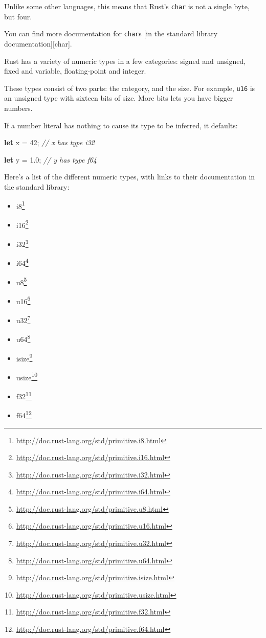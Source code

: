 \documentclass[a4paper,]{book}
\newenvironment{Shaded}{\begin{snugshade}}{\end{snugshade}}
\newcommand{\KeywordTok}[1]{\textcolor[rgb]{0.13,0.29,0.53}{\textbf{{#1}}}}
\newcommand{\DecValTok}[1]{\textcolor[rgb]{0.00,0.00,0.81}{{#1}}}
\newcommand{\CommentTok}[1]{\textcolor[rgb]{0.56,0.35,0.01}{\textit{{#1}}}}
\newcommand{\NormalTok}[1]{{#1}}
\renewcommand{\href}[2]{#2\footnote{\url{#1}}}
\begin{document}
Unlike some other languages, this means that Rust's \texttt{char} is not
a single byte, but four.

You can find more documentation for \texttt{char}s {[}in the standard
library documentation{]}{[}char{]}.


Rust has a variety of numeric types in a few categories: signed and
unsigned, fixed and variable, floating-point and integer.

These types consist of two parts: the category, and the size. For
example, \texttt{u16} is an unsigned type with sixteen bits of size.
More bits lets you have bigger numbers.

If a number literal has nothing to cause its type to be inferred, it
defaults:

\begin{Shaded}
\begin{Highlighting}[]
\KeywordTok{let} \NormalTok{x = }\DecValTok{42}\NormalTok{; }\CommentTok{// x has type i32}

\KeywordTok{let} \NormalTok{y = }\DecValTok{1.0}\NormalTok{; }\CommentTok{// y has type f64}
\end{Highlighting}
\end{Shaded}

Here's a list of the different numeric types, with links to their
documentation in the standard library:

\begin{itemize}
\itemsep1pt\parskip0pt
\item
  \href{http://doc.rust-lang.org/std/primitive.i8.html}{i8}
\item
  \href{http://doc.rust-lang.org/std/primitive.i16.html}{i16}
\item
  \href{http://doc.rust-lang.org/std/primitive.i32.html}{i32}
\item
  \href{http://doc.rust-lang.org/std/primitive.i64.html}{i64}
\item
  \href{http://doc.rust-lang.org/std/primitive.u8.html}{u8}
\item
  \href{http://doc.rust-lang.org/std/primitive.u16.html}{u16}
\item
  \href{http://doc.rust-lang.org/std/primitive.u32.html}{u32}
\item
  \href{http://doc.rust-lang.org/std/primitive.u64.html}{u64}
\item
  \href{http://doc.rust-lang.org/std/primitive.isize.html}{isize}
\item
  \href{http://doc.rust-lang.org/std/primitive.usize.html}{usize}
\item
  \href{http://doc.rust-lang.org/std/primitive.f32.html}{f32}
\item
  \href{http://doc.rust-lang.org/std/primitive.f64.html}{f64}
\end{itemize}
\end{document}
